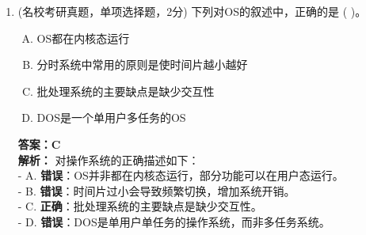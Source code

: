 \documentclass[lang=cn,newtx,10pt,scheme=chinese]{../../elegantbook}
\begin{document}
\begin{enumerate}
\item (名校考研真题，单项选择题，2分) 下列对OS的叙述中，正确的是 (    )。
    \begin{enumerate}[A.]
        \item OS都在内核态运行
        \item 分时系统中常用的原则是使时间片越小越好
        \item 批处理系统的主要缺点是缺少交互性
        \item DOS是一个单用户多任务的OS
    \end{enumerate}
    \textbf{答案：C}\\
    \textbf{解析：} 对操作系统的正确描述如下：\\
    - A. \textbf{错误}：OS并非都在内核态运行，部分功能可以在用户态运行。\\
    - B. \textbf{错误}：时间片过小会导致频繁切换，增加系统开销。\\
    - C. \textbf{正确}：批处理系统的主要缺点是缺少交互性。\\
    - D. \textbf{错误}：DOS是单用户单任务的操作系统，而非多任务系统。\\


\end{enumerate}
\end{document}
